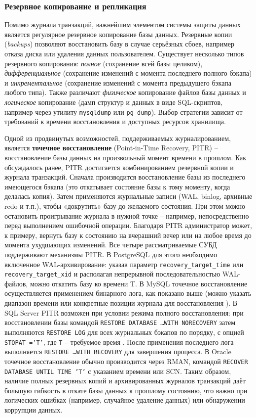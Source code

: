 \subsubsection{Резервное копирование и репликация} 

 Помимо журнала транзакций, важнейшим элементом системы защиты данных является регулярное резервное копирование базы данных. Резервные копии (\textit{backups}) позволяют восстановить базу в случае серьёзных сбоев, например отказа диска или удаления данных пользователем. Существует несколько типов резервного копирования: \textit{полное} (сохранение всей базы целиком), \textit{дифференциальное} (сохранение изменений с момента последнего полного бэкапа) и \textit{инкрементальное} (сохранение изменений с момента предыдущего бэкапа любого типа). Также различают \textit{физическое} копирование файлов базы данных и \textit{логическое} копирование (дамп структур и данных в виде SQL-скриптов, например через утилиту \texttt{mysqldump} или \texttt{pg\_dump}). Выбор стратегии зависит от требований к времени восстановления и доступных ресурсов хранилища. 
 
 Одной из продвинутых возможностей, поддерживаемых журналированием, является \textbf{точечное восстановление} (Point-in-Time Recovery, PITR) – восстановление базы данных на произвольный момент времени в прошлом. Как обсуждалось ранее, PITR достигается комбинированием резервной копии и журнала транзакций. Сначала производится восстановление базы из последнего имеющегося бэкапа (это откатывает состояние базы к тому моменту, когда делалась копия). Затем применяются журнальные записи (WAL, binlog, архивные redo и т.п.), чтобы «докрутить» базу до желаемого состояния. При этом можно остановить проигрывание журнала в нужной точке – например, непосредственно перед выполнением ошибочной операции. Благодаря PITR администратор может, к примеру, вернуть базу к состоянию на вчерашний вечер или на любое время до момента ухудшающих изменений. Все четыре рассматриваемые СУБД поддерживают механизмы PITR. В PostgreSQL для этого необходимо включенное WAL-архивирование: указав параметр \texttt{recovery\_target\_time} или \texttt{recovery\_target\_xid} и располагая непрерывной последовательностью WAL-файлов, можно откатить базу ко времени T. В MySQL точечное восстановление осуществляется применением бинарного лога, как показано выше (можно указать диапазон времени или конкретные позиции журнала для восстановления \autocite{Mysqldoc7}). В SQL Server PITR возможен при условии режима полного восстановления: при восстановлении базы командой \texttt{RESTORE DATABASE \ldots WITH NORECOVERY} затем выполняются \texttt{RESTORE LOG} для всех журнальных бэкапов по порядку, с опцией \texttt{STOPAT ='T'}, где \texttt{T} – требуемое время \autocite{MicrosoftLearnSQLserverTransLog}. После применения последнего лога выполняется \texttt{RESTORE \ldots WITH RECOVERY} для завершения процесса. В Oracle точечное восстановление обычно производится через RMAN, командой \texttt{RECOVER DATABASE UNTIL TIME 'T'} с указанием времени или SCN. Таким образом, наличие полных резервных копий и архивированных журналов транзакций даёт большую гибкость в откате базы данных к прошлому состоянию, что важно при логических ошибках (например, случайное удаление данных) или обнаружении коррупции данных. 
 

